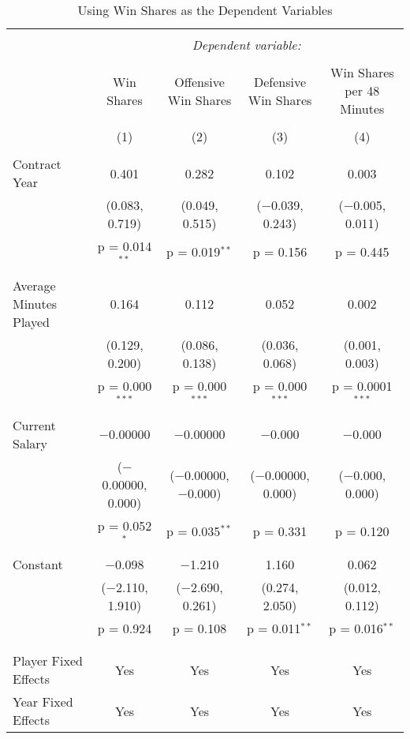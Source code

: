 \documentclass[12pt]{article}
\begin{document}
	\begin{sidewaystable}[!htbp] \centering 
		\caption{Using Win Shares as the Dependent Variables} 
		\label{regwinshare}
		\begin{tabular}{@{\extracolsep{5pt}}lcccc} 
			\\[-1.8ex]\hline 
			\hline \\[-1.8ex] 
			& \multicolumn{4}{c}{\textit{Dependent variable:}} \\ 
			\cline{2-5} 
			\\[-1.8ex] & Win Shares & Offensive Win Shares & Defensive Win Shares & Win Shares per 48 Minutes \\ 
			\\[-1.8ex] & (1) & (2) & (3) & (4)\\ 
			\hline \\[-1.8ex] 
			Contract Year & 0.401 & 0.282 & 0.102 & 0.003 \\ 
			& (0.083, 0.719) & (0.049, 0.515) & ($-$0.039, 0.243) & ($-$0.005, 0.011) \\ 
			& p = 0.014$^{**}$ & p = 0.019$^{**}$ & p = 0.156 & p = 0.445 \\ 
			& & & & \\ 
			Average Minutes Played & 0.164 & 0.112 & 0.052 & 0.002 \\ 
			& (0.129, 0.200) & (0.086, 0.138) & (0.036, 0.068) & (0.001, 0.003) \\ 
			& p = 0.000$^{***}$ & p = 0.000$^{***}$ & p = 0.000$^{***}$ & p = 0.0001$^{***}$ \\ 
			& & & & \\ 
			Current Salary & $-$0.00000 & $-$0.00000 & $-$0.000 & $-$0.000 \\ 
			& ($-$0.00000, 0.000) & ($-$0.00000, $-$0.000) & ($-$0.00000, 0.000) & ($-$0.000, 0.000) \\ 
			& p = 0.052$^{*}$ & p = 0.035$^{**}$ & p = 0.331 & p = 0.120 \\ 
			& & & & \\ 
			Constant & $-$0.098 & $-$1.210 & 1.160 & 0.062 \\ 
			& ($-$2.110, 1.910) & ($-$2.690, 0.261) & (0.274, 2.050) & (0.012, 0.112) \\ 
			& p = 0.924 & p = 0.108 & p = 0.011$^{**}$ & p = 0.016$^{**}$ \\ 
			& & & & \\ 
			\hline \\[-1.8ex] 
			Player Fixed Effects & Yes & Yes & Yes & Yes \\ 
			Year Fixed Effects & Yes & Yes & Yes & Yes \\ 

\end{tabular}
\end{sidewaystable}
\end{document}

